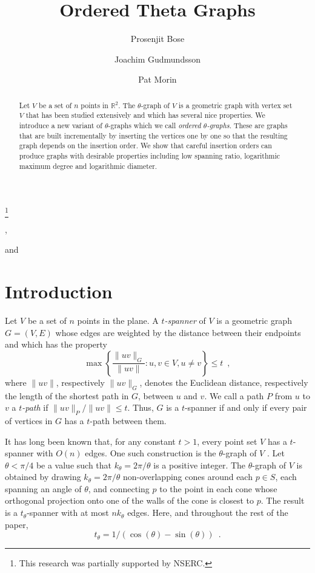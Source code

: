 \documentclass{elsart}
\newcommand{\spanratio}[1]{1/(\cos(#1)-\sin(#1))}
\begin{document}
\begin{frontmatter}
\title{Ordered Theta Graphs}
\thanks[nserc]{This research was partially supported by NSERC.}

\author[carleton]{Prosenjit Bose},
\author[eindhoven]{Joachim Gudmundsson} and 
\author[carleton]{Pat Morin}
\address[carleton]{School of Computer Science, Carleton University,
	1125 Colonel By Drive, \\ Ottawa, Ontario, Canada, K1S~5B6}
\address[eindhoven]{Faculty of Mathematics and Computer Science,
	TU Eindhoven, \\ 5600 MB Eindhoven, The Netherlands}

\begin{abstract}
Let $V$ be a set of $n$ points in $\mathbb{R}^2$.  The $\theta$-graph
of $V$ is a geometric graph with vertex set $V$ that has been studied
extensively and which has several nice properties.  We introduce a new
variant of $\theta$-graphs which we call \emph{ordered
$\theta$-graphs}.  These are graphs that are built incrementally by
inserting the vertices one by one so that the resulting graph depends
on the insertion order. We show that careful insertion orders can
produce graphs with desirable properties including low spanning ratio,
logarithmic maximum degree and logarithmic diameter.
\end{abstract}
\end{frontmatter}

\section{Introduction}

Let $V$ be a set of $n$ points in the plane.  A \emph{$t$-spanner} of
$V$ is a geometric graph $G=(V,E)$ whose edges are weighted by the
distance between their endpoints and which has the property
\[
  \max\left\{\frac{\|uv\|_G}{\|uv\|} : u,v\in V, u\neq v\right\} 
	\le t \enspace,
\]
where $\|uv\|$, respectively $\|uv\|_G$, denotes the Euclidean
distance, respectively the length of the shortest path in $G$, between
$u$ and $v$.  We call a path $P$ from $u$ to $v$ a \emph{$t$-path} if
$\|uv\|_P/\|uv\|\le t$.  Thus, $G$ is a $t$-spanner if and only if
every pair of vertices in $G$ has a $t$-path between them.

It has long been known that, for any constant $t>1$, every point set
$V$ has a $t$-spanner with $O(n)$ edges.  One such construction is the
$\theta$-graph of $V$ \cite{k88,kg92}.  Let $\theta<\pi/4$ be a value
such that $k_\theta=2\pi/\theta$ is a positive integer.  The
$\theta$-graph of $V$ is obtained by drawing $k_\theta=2\pi/\theta$
non-overlapping cones around each $p\in S$, each spanning an angle of
$\theta$, and connecting $p$ to the point in each cone whose
orthogonal projection onto one of the walls of the cone is closest to
$p$.  The result is a $t_\theta$-spanner with at most $nk_\theta$
edges.  Here, and throughout the rest of the paper,
\[
  t_\theta = \spanratio{\theta} \enspace .
\]
\end{document}
